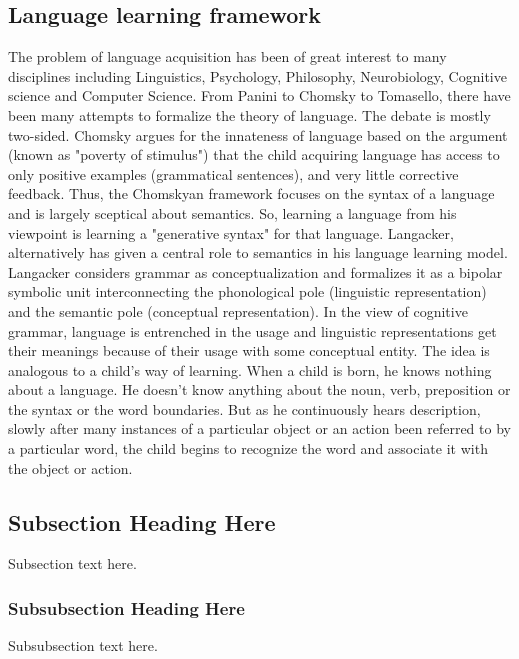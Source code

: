 \documentclass[compsoc]{IEEEtran}
\begin{document}
\subsection{Language learning framework}
The problem of language acquisition has been of great interest to many disciplines including Linguistics, Psychology, Philosophy, Neurobiology, Cognitive science and Computer Science. From Panini\cite{} to Chomsky\cite{} to Tomasello, there have been many attempts to formalize the theory of language. The debate is mostly two-sided. Chomsky\cite{} argues for the innateness of language based on the argument (known as "poverty of stimulus") that the child acquiring language has access to only positive examples (grammatical sentences), and very little corrective feedback. Thus, the Chomskyan framework focuses on the syntax of a language and is largely sceptical about semantics. So, learning a language from his viewpoint is learning a "generative syntax" for that language. Langacker\cite{}, alternatively has given a central role to semantics in his language learning model. Langacker\cite{} considers grammar as conceptualization and formalizes it as a bipolar symbolic unit interconnecting the phonological pole (linguistic representation) and the semantic pole (conceptual representation). In the view of cognitive grammar, language is entrenched in the usage and linguistic representations get their meanings because of their usage with some conceptual entity.
The idea is analogous to a child’s way of learning. When a child is born, he knows nothing about a language. He doesn’t know anything about the noun, verb, preposition or the syntax or the word boundaries. But as he continuously hears description, slowly after many instances of a particular object or an action been referred to by a particular word, the child begins to recognize the word and associate it with the object or action. 

\subsection{Subsection Heading Here}
Subsection text here.


\subsubsection{Subsubsection Heading Here}
Subsubsection text here.
\end{document}
